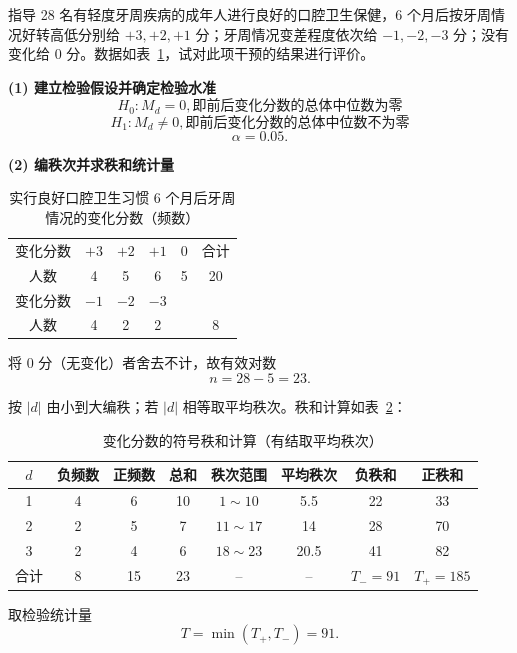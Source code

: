\documentclass[lang=cn,10pt]{elegantbook}
\begin{document}
\vspace{0.2cm}
\begin{exercise}
指导 28 名有轻度牙周疾病的成年人进行良好的口腔卫生保健，6 个月后按牙周情况好转高低分别给 $+3,+2,+1$ 分；牙周情况变差程度依次给 $-1,-2,-3$ 分；没有变化给 0 分。数据如表~\ref{tab:oral-change}，试对此项干预的结果进行评价。
\end{exercise}

\vspace{0.2cm}
\begin{solution}
\textbf{(1) 建立检验假设并确定检验水准}
\[
H_0: M_d = 0 ,即前后变化分数的总体中位数为零
\]
\[
H_1: M_d \ne 0,即前后变化分数的总体中位数不为零
\]
\[
\alpha=0.05.
\]

\textbf{(2) 编秩次并求秩和统计量}
\begin{table}[htbp]
\centering
\caption{实行良好口腔卫生习惯 6 个月后牙周情况的变化分数（频数）}
\label{tab:oral-change}
\begin{tabular}{cccccc}
\toprule
变化分数 & $+3$ & $+2$ & $+1$ & $0$ & 合计 \\
人数     & 4    & 5    & 6    & 5  & 20 \\
\midrule
变化分数 & $-1$ & $-2$ & $-3$ &  &  \\
人数     & 4    & 2    & 2    &  & 8 \\
\bottomrule
\end{tabular}
\end{table}

将 0 分（无变化）者舍去不计，故有效对数
\[
n=28-5=23.
\]

按 $|d|$ 由小到大编秩；若 $|d|$ 相等取平均秩次。秩和计算如表~\ref{tab:oral-rank}：
\begin{table}[htbp]
\centering
\caption{变化分数的符号秩和计算（有结取平均秩次）}
\label{tab:oral-rank}
\begin{tabular}{cccccccc}
\toprule
$d$ & 负频数 & 正频数 & 总和 & 秩次范围 & 平均秩次 & 负秩和 & 正秩和 \\
\midrule
1 & 4 & 6 & 10 & $1\sim 10$  & 5.5  & 22 & 33 \\
2 & 2 & 5 & 7  & $11\sim 17$ & 14   & 28 & 70 \\
3 & 2 & 4 & 6  & $18\sim 23$ & 20.5 & 41 & 82 \\
\midrule
合计 & 8 & 15 & 23 & -- & -- & $T_- = 91$ & $T_+ = 185$ \\
\bottomrule
\end{tabular}
\end{table}

取检验统计量
\[
T=\min(T_+,T_-)=91.
\]


\end{solution}
\end{document}

